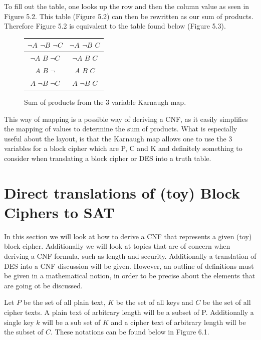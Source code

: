 \documentclass[11pt,a4paper, notitlepage]{report}
\begin{document}
\noindent To fill out the table, one looks up the row and then the column value as seen in Figure 5.2. This table (Figure 5.2) can then be rewritten as our sum of products. Therefore Figure 5.2 is equivalent to the table found below (Figure 5.3). 

\begin{figure}[H]
\centering
\label{Karnaugh5.3}
\begin{tabular}{|c|c|}
\hline
$\neg A$ $\neg B$ $\neg C$ & $\neg A$ $\neg B$ $C$ \\ \hline
$\neg A$ $B$ $\neg C$ & $\neg A$ $B$ $C$  \\ \hline
$A$ $B$ $\neg$ & $A$ $B$ $C$  \\ \hline
$A$ $\neg B$ $\neg C$ & $A$ $\neg B$ $C$  \\ \hline
\end{tabular}
\caption{Sum of products from the 3 variable Karnaugh map.}
\end{figure}

This way of mapping is a possible way of deriving a CNF, as it easily simplifies the mapping of values to determine the sum of products. What is especially useful about the layout, is that the Karnaugh map allows one to use the 3 variables for a block cipher which are P, C and K and definitely something to consider when translating a block cipher or DES into a truth table. 











\chapter{Direct translations of (toy) Block Ciphers to SAT}
\label{cha:dirtrans}

In this section we will look at how to derive a CNF that represents a given (toy) block cipher. Additionally we will look at topics that are of concern when deriving a CNF formula, such as length and security. Additionally a  translation of DES into a CNF discussion will be given. However, an outline of definitions must be given in a mathematical notion, in order to be precise about the elements that are going ot be discussed. 

Let $P$ be the set of all plain text, $K$ be the set of all keys and $C$ be the set of all cipher texts. A plain text of arbitrary length will be a subset of P. Additionally a single key $k$ will be a sub set of $K$ and a cipher text of arbitrary length will be the subset of $C$. These notations can be found below in Figure 6.1.
\end{document}
